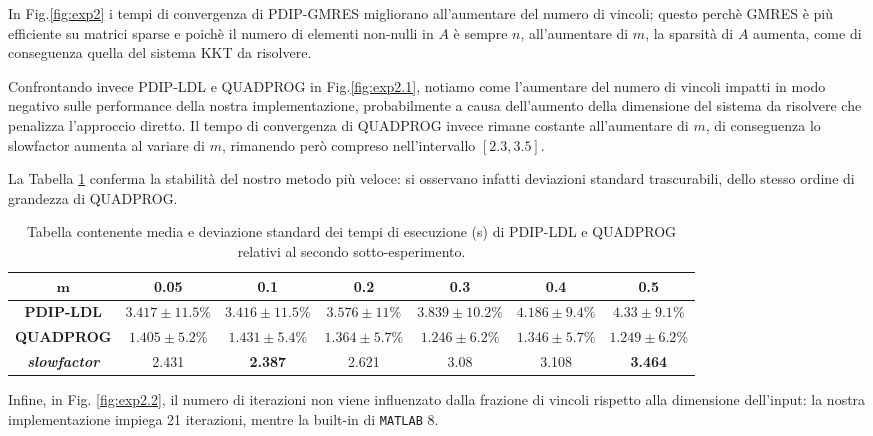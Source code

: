 In Fig.\ref{fig:exp2} i tempi di convergenza di PDIP-GMRES migliorano all'aumentare del numero di vincoli; questo perchè GMRES è più efficiente su matrici sparse e poichè il numero di elementi non-nulli in $A$ è sempre $n$, all'aumentare di $m$, la sparsità di $A$ aumenta, come di conseguenza quella del sistema KKT da risolvere.

Confrontando invece PDIP-LDL e QUADPROG in Fig.\ref{fig:exp2.1}, notiamo come l'aumentare del numero di vincoli impatti in modo negativo sulle performance della nostra implementazione, probabilmente a causa dell'aumento della dimensione del sistema da risolvere che penalizza l'approccio diretto. Il tempo di convergenza di QUADPROG invece rimane costante all'aumentare di $m$, di conseguenza lo slowfactor aumenta al variare di $m$, rimanendo però compreso nell'intervallo $[2.3, 3.5]$.

La Tabella \ref{tab:ldlqp2} conferma la stabilità del nostro metodo più veloce: si osservano infatti deviazioni standard trascurabili, dello stesso ordine di grandezza di QUADPROG.

\begin{table}[!h]
\centering
\begin{tabular}{c|c|c|c|c|c|c}

$\mathbf{m}$            & \textbf{0.05} & \textbf{0.1} & \textbf{0.2} & \textbf{0.3} & \textbf{0.4} & \textbf{0.5} \\ \hline
\textbf{PDIP-LDL}                    & $3.417 \pm 11.5\%$       & $3.416 \pm 11.5\%$       & $3.576     \pm 11\%$   & $3.839 \pm 10.2\%$      & $4.186 \pm 9.4\%$      & $4.33 \pm 9.1\%$       \\
\textbf{QUADPROG}                    & $1.405 \pm 5.2\%$       & $1.431 \pm 5.4\%$       & $1.364 \pm 5.7\%$       & $1.246 \pm 6.2\%$       & $1.346 \pm 5.7\%$       & $1.249 \pm 6.2\%$       \\
\textbf{\textit{slowfactor}} &2.431        & \textbf{2.387}      & 2.621       & 3.08       & 3.108       & \textbf{3.464} 
\end{tabular}
\caption{Tabella contenente media e deviazione standard dei tempi di esecuzione (s) di PDIP-LDL e QUADPROG relativi al secondo sotto-esperimento.\label{tab:ldlqp2}}
\end{table}

Infine, in Fig. \ref{fig:exp2.2}, il numero di iterazioni non viene influenzato dalla frazione di vincoli rispetto alla dimensione dell'input: la nostra implementazione impiega 21 iterazioni, mentre la built-in di \texttt{MATLAB} 8.


